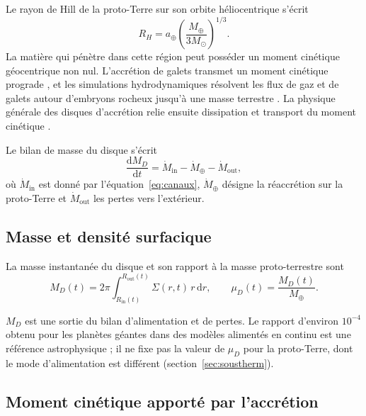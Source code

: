 \documentclass[11pt,a4paper,openany]{report}
\newcommand{\Mt}{M_{\oplus}}
\newcommand{\dd}{\mathrm{d}}
\begin{document}
Le rayon de Hill de la proto-Terre sur son orbite héliocentrique s'écrit
\begin{equation}
R_H=a_\oplus\left(\frac{\Mt}{3M_\odot}\right)^{1/3}.
\label{eq:RH}
\end{equation}
La matière qui pénètre dans cette région peut posséder un moment cinétique géocentrique non
nul. L'accrétion de galets transmet un moment cinétique prograde \cite{JohansenLacerda2010,Visser2020},
et les simulations hydrodynamiques résolvent les flux de gaz et de galets autour d'embryons
rocheux jusqu'à une masse terrestre \cite{Popovas2018}. La physique générale des disques
d'accrétion relie ensuite dissipation et transport du moment cinétique \cite{Pringle1981}.

Le bilan de masse du disque s'écrit
\begin{equation}
\frac{\dd M_D}{\dd t}=\dot M_{\mathrm{in}}-\dot M_{\oplus}-\dot M_{\mathrm{out}},
\label{eq:bilanM}
\end{equation}
où $\dot M_{\mathrm{in}}$ est donné par l'équation~\eqref{eq:canaux}, $\dot M_{\oplus}$ désigne la
réaccrétion sur la proto-Terre et $\dot M_{\mathrm{out}}$ les pertes vers l'extérieur.

\subsection{Masse et densité surfacique}

La masse instantanée du disque et son rapport à la masse proto-terrestre sont
\begin{equation}
M_D(t)=2\pi\int_{R_{\mathrm{in}}(t)}^{R_{\mathrm{out}}(t)}\Sigma(r,t)\,r\,\dd r,
\qquad
\mu_D(t)=\frac{M_D(t)}{\Mt}.
\label{eq:MD}
\end{equation}

\begin{lecture}
$M_D$ est une sortie du bilan d'alimentation et de pertes. Le rapport d'environ $10^{-4}$ obtenu
pour les planètes géantes dans des modèles alimentés en continu \cite{CanupWard2006} est une
référence astrophysique ; il ne fixe pas la valeur de $\mu_D$ pour la proto-Terre, dont le mode
d'alimentation est différent (section~\ref{sec:soustherm}).
\end{lecture}

\subsection{Moment cinétique apporté par l'accrétion}
\end{document}
